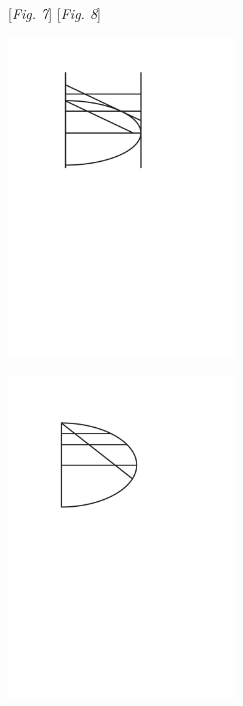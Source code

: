\vspace{8mm}
\hspace*{32mm} [\textit{Fig. 7}] \hspace*{55mm}  [\textit{Fig. 8}]
\pend
\vspace{1.5em}
\pstart
\noindent
\begin{minipage}[t]{0.5\textwidth}
\hspace*{23mm}                    
\includegraphics[width=0.45\textwidth]{images/lh0351009_004v-d3.pdf}
\end{minipage}
\hspace*{25mm}
\begin{minipage}[t]{0.5\textwidth}
\includegraphics[width=0.45\textwidth]{images/lh0351009_004v-d4.pdf}
\end{minipage}\\
